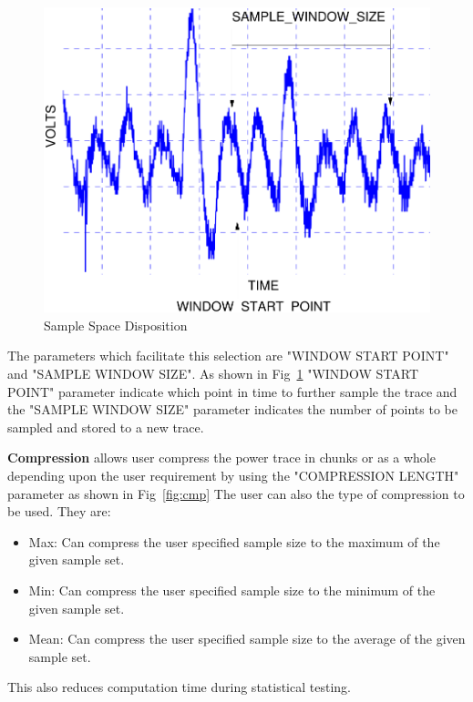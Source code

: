 \begin{figure}[ht]
\begin{center}
\includegraphics[scale=0.6]{figures/sampleSpaceDisp}
\caption{\label{fig:ssd}Sample Space Disposition}
\end{center} 
\vspace{-3ex}
\end{figure}

The parameters which facilitate this selection are "WINDOW START POINT" and "SAMPLE WINDOW SIZE". As shown in
Fig~\ref{fig:ssd} "WINDOW START POINT" parameter indicate which point in time to further sample the trace and the
"SAMPLE WINDOW SIZE" parameter indicates the number of points to be sampled and stored to a new trace.

\textbf{Compression} allows user compress the power trace in chunks or as a whole
depending upon the user requirement by using the "COMPRESSION LENGTH" parameter as shown in Fig~\ref{fig:cmp}
The user can also the type of compression to be used. They are:
\begin{itemize}
\item Max: Can compress the user specified sample size to the maximum of the given sample set.
\item Min: Can compress the user specified sample size to the minimum of the given sample set.
\item Mean: Can compress the user specified sample size to the average of the given sample set.
\end{itemize}

This also reduces computation time during statistical testing.

